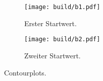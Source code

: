 \begin{figure}
  \centering
  \begin{subfigure}{0.49\textwidth}
    \centering
    \texttt{[image: build/b1.pdf]}
    \caption{Erster Startwert.}
    \label{sub:1}
  \end{subfigure}
  \begin{subfigure}{0.49\textwidth}
    \centering
    \texttt{[image: build/b2.pdf]}
    \caption{Zweiter Startwert.}
    \label{sub:2}
  \end{subfigure}
  \caption{Contourplots.}
  \label{fig:2}
\end{figure}

